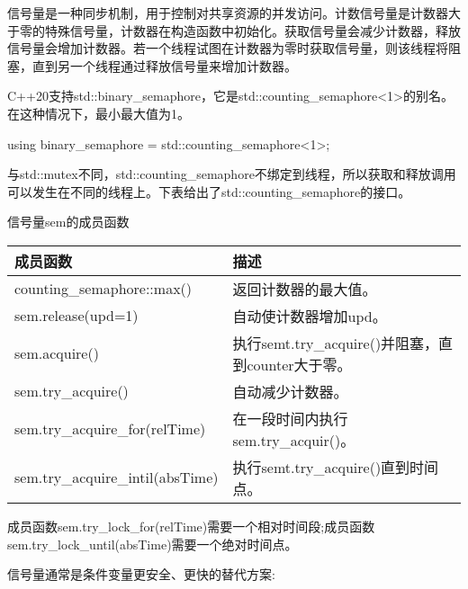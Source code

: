 信号量是一种同步机制，用于控制对共享资源的并发访问。计数信号量是计数器大于零的特殊信号量，计数器在构造函数中初始化。获取信号量会减少计数器，释放信号量会增加计数器。若一个线程试图在计数器为零时获取信号量，则该线程将阻塞，直到另一个线程通过释放信号量来增加计数器。

C++20支持std::binary\_semaphore，它是std::counting\_semaphore<1>的别名。在这种情况下，最小最大值为1。

\begin{cpp}
using binary_semaphore = std::counting_semaphore<1>;
\end{cpp}

与std::mutex不同，std::counting\_semaphore不绑定到线程，所以获取和释放调用可以发生在不同的线程上。下表给出了std::counting\_semaphore的接口。

\begin{center}
信号量sem的成员函数
\end{center}

\begin{longtable}[c]{|l|l|}
\hline
\textbf{成员函数}         & \textbf{描述}                             \\ \hline
\endfirsthead
%
\endhead
%
counting\_semaphore::max()       & 返回计数器的最大值。         \\ \hline
sem.release(upd=1)               & 自动使计数器增加upd。             \\ \hline
sem.acquire() & 执行semt.try\_acquire()并阻塞，直到counter大于零。 \\ \hline
sem.try\_acquire()               & 自动减少计数器。               \\ \hline
sem.try\_acquire\_for(relTime)   & 在一段时间内执行sem.try\_acquir()。 \\ \hline
sem.try\_acquire\_intil(absTime) & 执行semt.try\_acquire()直到时间点。  \\ \hline
\end{longtable}

成员函数sem.try\_lock\_for(relTime)需要一个相对时间段;成员函数sem.try\_lock\_until(absTime)需要一个绝对时间点。

信号量通常是条件变量更安全、更快的替代方案:


